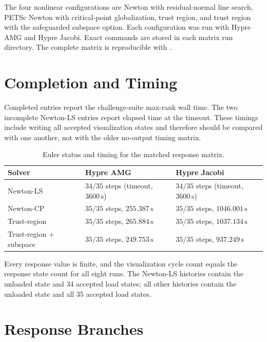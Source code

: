 \documentclass{article}
\begin{document}
The four nonlinear configurations are Newton with residual-normal line search,
PETSc Newton with critical-point globalization, trust region, and trust region with
the safeguarded subspace option.  Each configuration was run with Hypre AMG and
Hypre Jacobi.  Exact commands are stored in each matrix run directory.  The complete
matrix is reproducible with .

\section*{Completion and Timing}

Completed entries report the challenge-suite max-rank wall time.  The two incomplete
Newton-LS entries report elapsed time at the timeout.  These timings include writing
all accepted visualization states and therefore should be compared with one another,
not with the older no-output timing matrix.

\begin{table}[h]
  \centering
  \small
  \caption{Euler status and timing for the matched response matrix.}
  \begin{tabular}{@{}lll@{}}
    \toprule
    Solver & Hypre AMG & Hypre Jacobi \\
    \midrule
    Newton-LS & $34/35$ steps (timeout, $3600\,\mathrm{s}$) & $34/35$ steps (timeout, $3600\,\mathrm{s}$) \\
    Newton-CP & $35/35$ steps, $255.387\,\mathrm{s}$ & $35/35$ steps, $1046.001\,\mathrm{s}$ \\
    Trust-region & $35/35$ steps, $265.884\,\mathrm{s}$ & $35/35$ steps, $1037.134\,\mathrm{s}$ \\
    Trust-region + subspace & $35/35$ steps, $249.753\,\mathrm{s}$ & $35/35$ steps, $937.249\,\mathrm{s}$ \\
    \bottomrule
  \end{tabular}
\end{table}

Every response value is finite, and the visualization cycle count equals the response
state count for all eight runs.  The Newton-LS histories contain the unloaded state
and 34 accepted load states; all other histories contain the unloaded state and all
35 accepted load states.

\section*{Response Branches}
\end{document}
